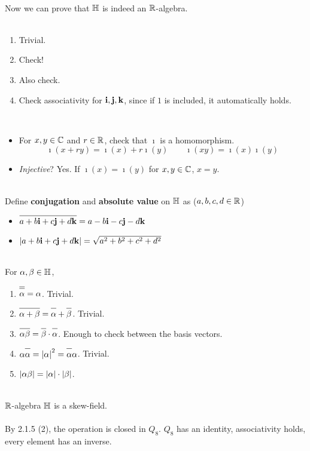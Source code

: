 \\
Now we can prove that $\mathbb{H}$ is indeed an $\mathbb{R}$-algebra.\\
\\
\begin{enumerate}
	\item Trivial.
	\item Check!
	\item Also check.
	\item Check associativity for $\mathrm{\mathbf{i}}, \mathrm{\mathbf{j}}, \mathrm{\mathbf{k}}$, since if $1$ is included, it automatically holds.
\end{enumerate}~
\\
\begin{itemize}
	\item For $x, y\in \mathbb{C}$ and $r\in \mathbb{R}$, check that $\imath$ is a homomorphism. $$\imath(x + ry) = \imath(x) + r\imath(y) \qquad \imath(xy) = \imath(x)\imath(y)$$
	\item \textit{Injective}? Yes. If $\imath(x) = \imath(y)$ for $x, y\in \mathbb{C}$, $x = y$.
\end{itemize}~
\\
 Define \textbf{conjugation} and \textbf{absolute value} on $\mathbb{H}$ as ($a, b, c, d\in \mathbb{R}$)
\begin{itemize}
	\item $\conj{a+b\rmbf{i}+c\rmbf{j}+d\rmbf{k}} = a-b\rmbf{i}-c\rmbf{j}-d\rmbf{k}$
	\item $\left|a+b\mathrm{\mathbf{i}}+c\mathrm{\mathbf{j}}+d\mathrm{\mathbf{k}}\right| = \sqrt{a^2+b^2+c^2+d^2}$
\end{itemize}~
\\
 For $\alpha, \beta \in \mathbb{H}$,
\begin{enumerate}
	\item $\conj{\conj{\alpha}} = \alpha$. Trivial.
	\item $\conj{\alpha+\beta} = \conj{\alpha}+  \conj{\beta}$. Trivial.
	\item $\conj{\alpha\beta} = \conj{\beta}\cdot\conj{\alpha}$. Enough to check between the basis vectors.
	\item $\alpha\conj{\alpha} = \abs{\alpha}^2 = \conj{\alpha}\alpha$. Trivial.
	\item $\left|\alpha\beta\right| = \left|\alpha\right|\cdot\left|\beta\right|$.
\end{enumerate}~
\\
 $\mathbb{R}$-algebra $\mathbb{H}$ is a skew-field.\\
\\
 By 2.1.5 (2), the operation is closed in $Q_8$. $Q_8$ has an identity, associativity holds, every element has an inverse.\\
